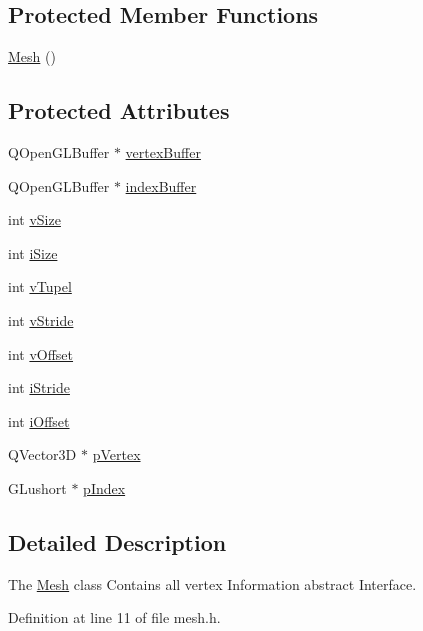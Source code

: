 \subsection*{Protected Member Functions}
\begin{DoxyCompactItemize}
\item 
\hyperlink{class_mesh_a2af137f1571af89172b9c102302c416b}{Mesh} ()
\end{DoxyCompactItemize}
\subsection*{Protected Attributes}
\begin{DoxyCompactItemize}
\item 
Q\+Open\+G\+L\+Buffer $\ast$ \hyperlink{class_mesh_ae53507ed0f2756e37a55e57a169cbec0}{vertex\+Buffer}
\item 
Q\+Open\+G\+L\+Buffer $\ast$ \hyperlink{class_mesh_a4b4a752380875f7ade2301f656a45a51}{index\+Buffer}
\item 
int \hyperlink{class_mesh_a840028792aecdad5f9b649222329d521}{v\+Size}
\item 
int \hyperlink{class_mesh_ac6283b99dbb698e2efd83357278b06b7}{i\+Size}
\item 
int \hyperlink{class_mesh_a07d24d28a6cf55b5575e0525dd9ecceb}{v\+Tupel}
\item 
int \hyperlink{class_mesh_a5e054aa2a4f8e2af8f1f5342ef847f26}{v\+Stride}
\item 
int \hyperlink{class_mesh_a251ab9a090efb842f2b5e2674d31e112}{v\+Offset}
\item 
int \hyperlink{class_mesh_afe2f0742c0ef6088eaf38b87a8896392}{i\+Stride}
\item 
int \hyperlink{class_mesh_a8837e5a3b75f17b5ebab3b67928489ce}{i\+Offset}
\item 
Q\+Vector3\+D $\ast$ \hyperlink{class_mesh_a32d007d7d539832b7feb35e11ff4586c}{p\+Vertex}
\item 
G\+Lushort $\ast$ \hyperlink{class_mesh_a96ad2c21d6a2da165217d5ff53ec72b4}{p\+Index}
\end{DoxyCompactItemize}


\subsection{Detailed Description}
The \hyperlink{class_mesh}{Mesh} class Contains all vertex Information abstract Interface. 

Definition at line 11 of file mesh.\+h.



